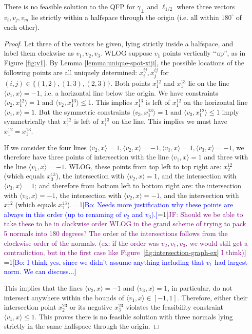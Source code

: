 \documentclass[anon]{colt2020} %
\newcommand{\Comments}{1}
\newcommand{\mynote}[2]{\ifnum\Comments=1\textcolor{#1}{#2}\fi}
\newcommand{\jessie}[1]{\mynote{purple}{[JF: #1]}}
\newcommand{\bo}[1]{\mynote{blue}{[Bo: #1]}}
\newcommand{\inprod}[2]{\langle #1, #2 \rangle}%
\begin{document}
\begin{lemma} \label{lemma:180-degree-no-three}
	There is no feasible solution to the QFP for $\gamma_{\bot}$ and $\ell_{1/2}$ where three vectors $v_i,v_j,v_m$ lie strictly within a halfspace through the origin (i.e. all within $180^{\circ}$ of each other).
\end{lemma}
\begin{proof}
	Let three of the vectors be given, lying strictly inside a halfspace, and label them clockwise as $v_1,v_2,v_3$.
	WLOG suppose $v_1$ points vertically ``up'', as in Figure \ref{fig:v1}.
	By Lemma \ref{lemma:unique-spot-xiji}, the possible locations of the following points are all uniquely determined: $x^{ij}_i, x^{ij}_j$ for $(i,j) \in \{(1,2),(1,3),(2,3)\}$.
	Both points $x^{12}_1$ and $x^{13}_1$ lie on the line $\inprod{v_1}{x} = -1$, i.e. a horizontal line below the origin.
	We have constraints $\inprod{v_2}{x^{12}_1} = 1$ and $\inprod{v_2}{x^{13}_1} \leq 1$.
	This implies $x^{13}_1$ is left of $x^{12}_1$ on the horizontal line $\inprod{v_1}{x} = 1$. 
	But the symmetric constraints $\inprod{v_3}{x^{13}_1} = 1$ and $\inprod{v_3}{x^{12}_1} \leq 1$ imply symmetrically that $x^{12}_1$ is left of $x^{13}_1$ on the line.
	This implies we must have $x^{12}_1 = x^{13}_1$.
	
	If we consider the four lines $\inprod{v_2}{x}=1, \inprod{v_2}{x}=-1, \inprod{v_3}{x}=1, \inprod{v_3}{x}=-1$, we therefore have three points of intersection with the line $\inprod{v_1}{x}=1$ and three with the line $\inprod{v_1}{x}=-1$. 
	WLOG, these points from top left to top right are: $x^{12}_2$ (which equals $x^{13}_3$), the intersection with $\inprod{v_2}{x}=1$, and the intersection with $\inprod{v_3}{x}=1$; and therefore from bottom left to bottom right are: the intersection with $\inprod{v_3}{x}=-1$, the intersection with $\inprod{v_2}{x}=-1$, and the intersection with $x^{12}_1$ (which equals $x^{13}_1$).
	\bo{Needs more justification why these points are always in this order (up to renaming of $v_2$ and $v_3$).}\jessie{Should we be able to take these to be in clockwise order WLOG in the grand scheme of trying to pack 5 normals into 180 degrees?  The order of the intersections follows from the clockwise order of the normals.  (ex: if the order was $v_2, v_1, v_3$, we would still get a contradiction, but in the first case like Figure~\ref{fig:intersection-graph-ex} I think)} \bo{I think yes, since we didn't assume anything including that $v_1$ had largest norm. We can discuss...}
	
	This implies that the lines $\inprod{v_2}{x}=-1$ and $\inprod{v_3}{x}=1$, in particular, do not intersect anywhere within the bounds of $\inprod{v_1}{x} \in [-1,1]$.
	Therefore, either their intersection point $x^{23}_2$ or its negative $x^{23}_3$ violates the feasibility constraint $\inprod{v_1}{x} \leq 1$.
	This proves there is no feasible solution with three normals lying strictly in the same halfspace through the origin.
\end{proof}
\end{document}
